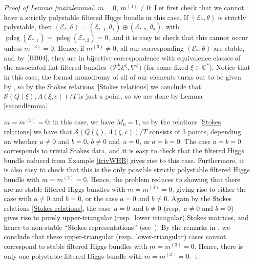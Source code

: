 \documentclass[11pt]{article}
\numberwithin{equation}{section}
\numberwithin{equation}{section}
\begin{document}
\begin{proof}[Proof of Lemma \ref{mainlemma}]
$m=0$, $m^{(3)}\neq 0$: Let first check that we cannot have a strictly polystable filtered Higgs bundle in this case. If $(\mathcal{E}_*,\theta)$ is strictly polystable, then $(\mathcal{E}_*,\theta)=(\mathcal{E}_{*,1},\theta_1)\oplus(\mathcal{E}_{*,2},\theta_2)$, with $\operatorname{pdeg}(\mathcal{E}_{*,1})=\operatorname{pdeg}(\mathcal{E}_{*,2})=0$, and it is easy to check that this cannot occur unless $m^{(3)}=0$. Hence, if $m^{(3)}\neq 0$, all our corresponding $(\mathcal{E}_*,\theta)$ are stable, and by $\cite{BB04}$, they are in bijective correspondence with equivalence classes of the associated flat filtered bundles~${\bigl(\mathcal{P}^h_{*}\mathcal{E}^{\xi},\nabla^{\xi}\bigr)}$ (for some fixed $\xi \in \mathbb{C}^*$). Notice that in this case, the formal monodromy of all of our elements turns out to be given by , so by the Stokes relations~\eqref{Stokes relations} we conclude that $\mathcal{S}(Q(\xi),\Lambda(\xi,c))/T$ is just a point, so we are done by Lemma \ref{secondlemma}.

$m=m^{(3)}=0$: in this case, we have $M_0=1$, so by the relations \ref{Stokes relations} we have that $\mathcal{S}(Q(\xi),\Lambda(\xi,c))/T$ consists of $3$ points, depending on whether $a\neq 0$ and $b=0$, $b\neq 0$ and~${a=0}$, or $a=b=0$. The case $a=b=0$ corresponds to trivial Stokes data, and it is easy to check that the filtered Higgs bundle induced from Example \ref{trivWHB} gives rise to this case. Furthermore, it is also easy to check that this is the only possible strictly polystable filtered Higgs bundle with $m=m^{(3)}=0$. Hence, the problem reduces to showing that there are no stable filtered Higgs bundles with $m=m^{(3)}=0$, giving rise to either the case with $a\neq 0$ and $b=0$, or the case $a=0$ and $b\neq 0$. Again by the Stokes relations \eqref{Stokes relations}, the case~${a=0}$ and $b\neq 0$ (resp.\ $a\neq 0$ and $b=0$) gives rise to purely upper-triangular (resp.\ lower triangular) Stokes matrices, and hence to non-stable ``Stokes representations'' (see~\cite{B3}). By the remarks in \cite[p.\ 50]{B3}, we conclude that these upper-triangular (resp.\ lower-triangular) cases cannot correspond to stable filtered Higgs bundles with $m=m^{(3)}=0$. Hence, there is only one polystable filtered Higgs bundle with $m=m^{(3)}=0$.
\end{proof}
\end{document}
